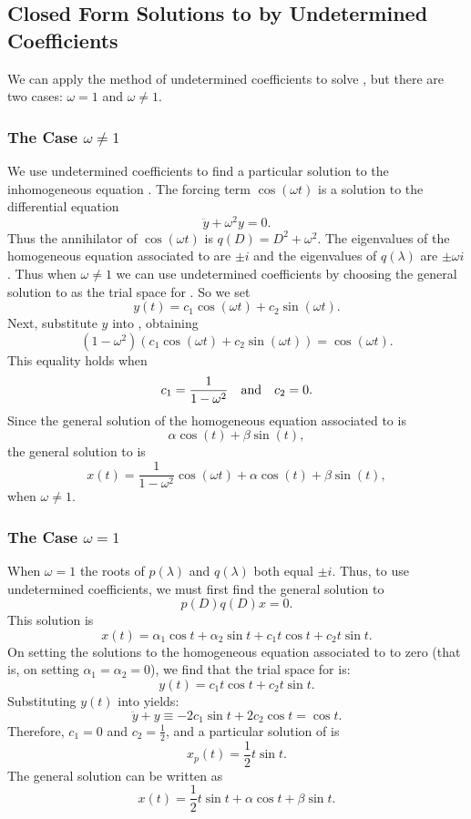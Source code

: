 \subsection*{Closed Form Solutions to  by Undetermined 
Coefficients}

We can apply the method of undetermined coefficients to solve , 
but there are two cases: $\omega=1$ and $\omega\neq 1$. 

\subsubsection*{The Case $\omega\not= 1$}  

We use undetermined coefficients to find a particular solution to the 
inhomogeneous equation .  The forcing term $\cos(\omega t)$ is 
a solution to the differential equation 
\begin{equation}  \label{E:omega}
\ddot{y} + \omega^2y = 0.
\end{equation}
Thus the annihilator 
of $\cos(\omega t)$ is $q(D)=D^2+\omega^2$.  The 
eigenvalues of the homogeneous equation associated to  are 
$\pm i$ and the eigenvalues of $q(\lambda)$ are $\pm\omega i$.  Thus when 
$\omega\neq 1$ we can use undetermined coefficients by choosing the general 
solution to  as the trial space 
for .  So we set
\[
y(t) = c_1\cos(\omega t) + c_2\sin(\omega t).
\]
Next, substitute $y$ into , obtaining
\[
(1-\omega ^2)(c_1\cos(\omega t) + c_2\sin(\omega t)) = \cos(\omega t).
\]
This equality holds when 
\[
c_1 = \frac{1}{1-\omega ^2} \quad\mbox{and}\quad c_2=0.
\]
Since the general solution of the 
homogeneous equation associated 
to  is
\[
\alpha \cos(t)+\beta\sin(t),
\]
the general solution to  is
\[
x(t) =\frac{1}{1-\omega ^2}\cos(\omega t) + \alpha\cos(t) + \beta\sin(t),
\]
when $\omega \neq 1$. 

\subsubsection*{The Case $\omega= 1$}

When $\omega= 1$ the roots of $p(\lambda)$ and $q(\lambda)$ both equal 
$\pm i$.  Thus, to use undetermined coefficients, we must first find the 
general solution to 
\[
p(D)q(D)x = 0.
\]
This solution is 
\[
x(t) = \alpha_1\cos t + \alpha_2\sin t + c_1t\cos t + c_2t\sin t.
\]
On setting the solutions to the homogeneous equation associated to 
 to zero (that is, on setting $\alpha_1=\alpha_2=0$), we 
find that the trial space for  is:
\[
y(t) = c_1t\cos t + c_2t\sin t.
\]
Substituting $y(t)$ into  yields:
\[
\ddot{y} + y \equiv -2c_1\sin t + 2c_2\cos t = \cos t.
\]
Therefore, $c_1=0$ and $c_2=\frac{1}{2}$, and a particular solution of 
 is 
\[
x_p(t) = \frac{1}{2}t\sin t.
\]
The general solution can be written as
\[
x(t) = \frac{1}{2}t\sin t+\alpha\cos t+\beta\sin t.
\]

